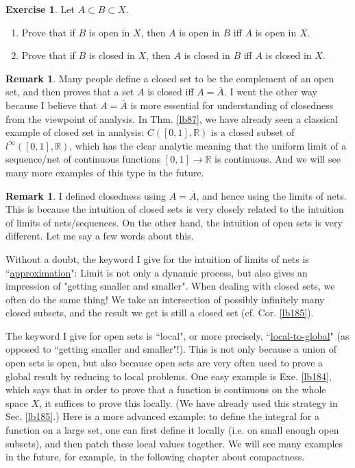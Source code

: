 \documentclass[12pt,b5paper,notitlepage]{article}
\theoremstyle{definition}
\newtheorem{exe}[df]{Exercise}
\newtheorem{rem}[df]{Remark}
\theoremstyle{plain}
\newcommand{\ovl}{\overline}
\newcommand{\Rbb}{\mathbb R}
\numberwithin{equation}{section}
\begin{document}
\begin{exe}\label{lb341}
Let $A\subset B\subset X$. 
\begin{enumerate}
\item Prove that if $B$ is open in $X$, then $A$ is open in $B$ iff $A$ is open in $X$.
\item Prove that if $B$ is closed in $X$, then $A$ is closed in $B$ iff $A$ is closed in $X$.
\end{enumerate}
\end{exe}







\begin{rem}
Many people define a closed set to be the complement of an open set, and then proves that a set $A$ is closed iff $A=\ovl A$. I went the other way because I believe that $A=\ovl A$ is more essential for understanding of closedness from the viewpoint of analysis. In Thm. \ref{lb87}, we have already seen a classical example of closed set in analysis: $C([0,1],\Rbb)$ is a closed subset of $l^\infty([0,1],\Rbb)$, which has the clear analytic meaning that the uniform limit of a sequence/net of continuous functions $[0,1]\rightarrow\Rbb$ is continuous. And we will see many more examples of this type in the future.
\end{rem}

\begin{rem}\label{lb229}
I defined closedness using $A=\ovl A$, and hence using the limits of nets. This is because the intuition of closed sets is very closely related to the intuition of limits of nets/sequences. On the other hand, the intuition of open sets is very different. Let me say a few words about this.

Without a doubt, the keyword I give for the intuition of limits of nets is ``\uline{approximation}": Limit is not only a dynamic process, but also gives an impression of "getting smaller and smaller". When dealing with closed sets, we often do the same thing! We take an intersection of possibly infinitely many closed subsets, and the result we get is still a closed set (cf. Cor. \ref{lb185}). 

The keyword I give for open sets is ``local", or more precisely, ``\uline{local-to-global}" (as opposed to ``getting smaller and smaller"!). This is not only because a union of open sets is open, but also because open sets are very often used to prove a global result by reducing to local problems. One easy example is Exe. \ref{lb184}, which says that in order to prove that a function is continuous on the whole space $X$, it suffices to prove this locally. (We have already used this strategy in Sec. \ref{lb185}.) Here is a more advanced example: to define the integral for a function on a large set, one can first define it locally (i.e. on small enough open subsets), and then patch these local values together. We will see many examples in the future, for example, in the following chapter about compactness.
\end{rem}
\end{document}
